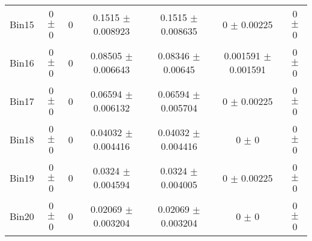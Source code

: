 \begin{tabular}{@{\extracolsep{4pt}}lcccccc@{}}
     Bin15 & 0 $\pm$ 0 & 0 & 0.1515 $\pm$ 0.008923 & 0.1515 $\pm$ 0.008635 & 0 $\pm$ 0.00225 & 0 $\pm$ 0 \\ 
     Bin16 & 0 $\pm$ 0 & 0 & 0.08505 $\pm$ 0.006643 & 0.08346 $\pm$ 0.00645 & 0.001591 $\pm$ 0.001591 & 0 $\pm$ 0 \\ 
     Bin17 & 0 $\pm$ 0 & 0 & 0.06594 $\pm$ 0.006132 & 0.06594 $\pm$ 0.005704 & 0 $\pm$ 0.00225 & 0 $\pm$ 0 \\ 
     Bin18 & 0 $\pm$ 0 & 0 & 0.04032 $\pm$ 0.004416 & 0.04032 $\pm$ 0.004416 & 0 $\pm$ 0 & 0 $\pm$ 0 \\ 
     Bin19 & 0 $\pm$ 0 & 0 & 0.0324 $\pm$ 0.004594 & 0.0324 $\pm$ 0.004005 & 0 $\pm$ 0.00225 & 0 $\pm$ 0 \\ 
     Bin20 & 0 $\pm$ 0 & 0 & 0.02069 $\pm$ 0.003204 & 0.02069 $\pm$ 0.003204 & 0 $\pm$ 0 & 0 $\pm$ 0 \\ 
\hline\hline
  \end{tabular}
